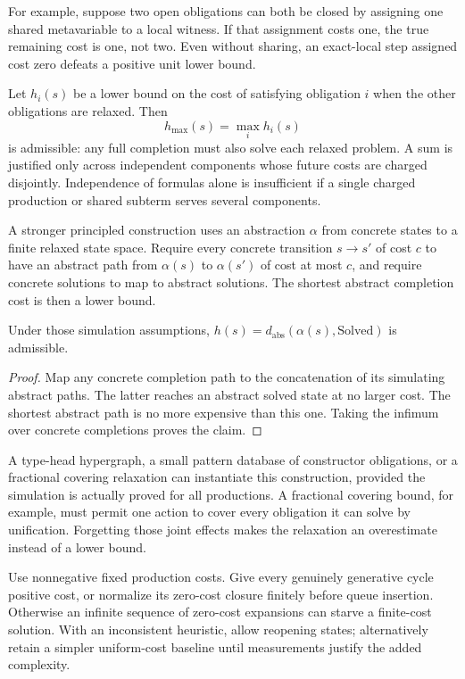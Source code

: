 For example, suppose two open obligations can both be closed by assigning one shared metavariable to a local witness. If that assignment costs one, the true remaining cost is one, not two. Even without sharing, an exact-local step assigned cost zero defeats a positive unit lower bound.

Let $h_i(s)$ be a lower bound on the cost of satisfying obligation $i$ when the other obligations are relaxed. Then
\[
  h_{\max}(s)=\max_i h_i(s)
\]
is admissible: any full completion must also solve each relaxed problem. A sum is justified only across independent components whose future costs are charged disjointly. Independence of formulas alone is insufficient if a single charged production or shared subterm serves several components.

A stronger principled construction uses an abstraction $\alpha$ from concrete states to a finite relaxed state space. Require every concrete transition $s\to s'$ of cost $c$ to have an abstract path from $\alpha(s)$ to $\alpha(s')$ of cost at most $c$, and require concrete solutions to map to abstract solutions. The shortest abstract completion cost is then a lower bound.

\begin{proposition}
Under those simulation assumptions, $h(s)=d_{\mathrm{abs}}(\alpha(s),\mathrm{Solved})$ is admissible.
\end{proposition}
\begin{proof}
Map any concrete completion path to the concatenation of its simulating abstract paths. The latter reaches an abstract solved state at no larger cost. The shortest abstract path is no more expensive than this one. Taking the infimum over concrete completions proves the claim.
\end{proof}

A type-head hypergraph, a small pattern database of constructor obligations, or a fractional covering relaxation can instantiate this construction, provided the simulation is actually proved for all productions. A fractional covering bound, for example, must permit one action to cover every obligation it can solve by unification. Forgetting those joint effects makes the relaxation an overestimate instead of a lower bound.

Use nonnegative fixed production costs. Give every genuinely generative cycle positive cost, or normalize its zero-cost closure finitely before queue insertion. Otherwise an infinite sequence of zero-cost expansions can starve a finite-cost solution. With an inconsistent heuristic, allow reopening states; alternatively retain a simpler uniform-cost baseline until measurements justify the added complexity.

